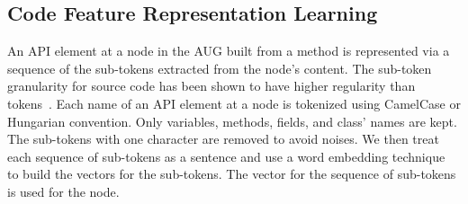 \subsection{Code Feature Representation Learning}
\label{sec:features}

An API element at a node in the AUG built from a method is represented
via a sequence of the sub-tokens extracted from the node's
content. The sub-token granularity for source code has been shown to
have higher regularity than tokens~\cite{icse20-methodname}. Each name
of an API element at a node is tokenized using CamelCase or Hungarian
convention. Only variables, methods, fields, and class' names are
kept. The sub-tokens with one character are removed to avoid
noises. We then treat each sequence of sub-tokens as a sentence and
use a word embedding technique~\cite{glove2014} to build the vectors
for the sub-tokens.  The vector for the sequence of sub-tokens is used
for the node.

